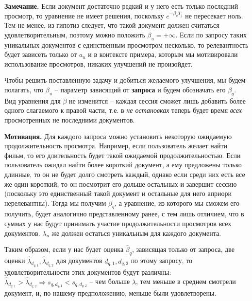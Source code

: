 \documentclass[diploma]{nanolab2015}
\begin{document}
  \textbf{Замечание.} Если документ достаточно редкий и у него есть только последний просмотр, то уравнение не имеет решения, поскольку $e^{-\beta_u T_j}$ не пересекает ноль. Тем не менее, из гипотиз следует, что такой документ должен считаться удовлетворительным, поэтому можно положить $\beta_u = +\infty$. Если по запросу таких уникальных документов с единственным просмотром несколько, то релевантность будет зависеть только от $a_u$ и в контексте примера, которым мы мотивировали использование просмотров, никаких улучшений не произойдет.

  Чтобы решить поставленную задачу и добиться желаемого улучшения, мы будем полагать, что $\beta_u$ -- параметр зависящий от \textbf{запроса} и будем обозначать его $\beta_q$. Вид уравнения для $\beta$ не изменится -- каждая сессия сможет лишь добавить более одного слагаемого к правой части, т.е. в \textit{не остановках} теперь будет время \textit{всех} просмотренных не последними документов.

  \textbf{Мотивация.} Для каждого запроса можно установить некоторую ожидаемую продолжительность просмотра. Например, если пользователь желает найти фильм, то его длительность будет такой ожидаемой продолжительностью. Если пользователь ожидал найти более короткий документ, а ему предложены только длинные, то он не будет долго смотреть каждый, однако если среди них есть все же один короткий, то он посмотрит его дольше остальных и завершит сессию (поскольку это единственный такой документ и остальные для него априори нерелевантны). Тогда мы получим $\beta_q$, а уравнение, из которого мы сможем его получить, будет аналогично представленному ранее, с тем лишь отличием, что в суммах у нас будут принимать участие продолжительности просмотров всех документов. $\lambda_u$ же должен остаться уникальным для каждого документа.

  Таким образом, если у нас будет оценка $\hat{\beta}_q$, зависящая только от запроса, две оценки $\hat{\lambda}_{d_{q,1}}, \hat{\lambda}_{d_{q,2}}$ для документов $d_{q,1}, d_{q,2}$ по этому запросу, то удовлетворительности этих документов будут различны: $\hat{\lambda}_{d_{q,1}} > \hat{\lambda}_{d_{q,2}} \Rightarrow s_{q,d_{q,1}} < s_{q,d_{q,2}}$ -- чем больше $\lambda$, тем меньше в среднем смотрели документ, и, по нашему предположению, меньше были удовлетворены.
\end{document}

